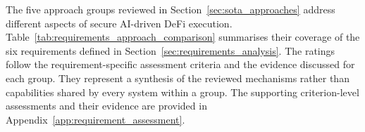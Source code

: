 The five approach groups reviewed in
Section~\ref{sec:sota_approaches} address different aspects
of secure AI-driven DeFi execution. Table~\ref{tab:requirements_approach_comparison}
summarises their coverage of the six requirements defined
in Section~\ref{sec:requirements_analysis}. The ratings
follow the requirement-specific assessment criteria and
the evidence discussed for each group. They represent
a synthesis of the reviewed mechanisms rather than
capabilities shared by every system within a group.
The supporting criterion-level assessments and their
evidence are provided in
Appendix~\ref{app:requirement_assessment}.

\begin{table}[H]
\centering
\renewcommand{\arraystretch}{1.4}
\caption{Requirement coverage of the reviewed approach groups
according to the assessment criteria defined in
Section~\ref{sec:requirements_analysis}.}
\label{tab:requirements_approach_comparison}
\end{table}



